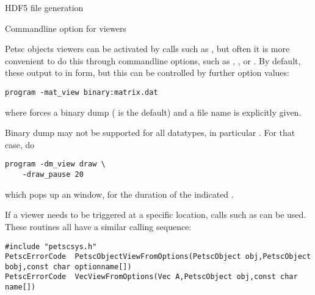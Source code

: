 \begin{pythonnote}{HDF5 file generation}
\end{pythonnote}

 {Commandline option for viewers}

Petsc objects viewers can be activated by calls such as ,
but often it is more convenient to do this through commandline options,
such as , ,
or .
By default, these output to  in  form,
but this can be controlled by further option values:
\begin{verbatim}
program -mat_view binary:matrix.dat
\end{verbatim}
where  forces a binary dump ( is the default)
and a file name is explicitly given.

Binary dump may not be supported for all datatypes,
in particular .
For that case, do
\begin{verbatim}
program -dm_view draw \
    -draw_pause 20
\end{verbatim}
which pops up an  window,
for the duration of the indicated .

If a viewer needs to be triggered at a specific location,
calls such as  can be used.
These routines all have a similar calling sequence:
\begin{lstlisting}
#include "petscsys.h"    
PetscErrorCode  PetscObjectViewFromOptions(PetscObject obj,PetscObject bobj,const char optionname[])
PetscErrorCode  VecViewFromOptions(Vec A,PetscObject obj,const char name[])
\end{lstlisting}

